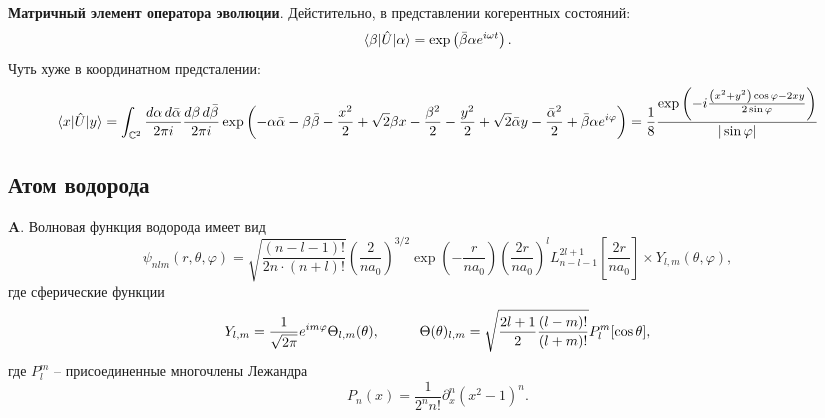 \textbf{Матричный элемент оператора эволюции}. Дейстительно, в представлении когерентных состояний:
\begin{equation*}
    \bk{\beta}[\hat{U}]{\alpha} = \exp\left(\bar{\beta} \alpha e^{i \omega t}\right).
\end{equation*}
Чуть хуже в координатном предсталении:
\begin{equation*}
\langle x | \hat{U}| y\rangle = 
    \int_{\mathbb{C}^2} \frac{ d\alpha \, d \bar{\alpha}}{2 \pi i} \frac{ d\beta \, d \bar{\beta}}{2 \pi i}  \exp\left(
        - \alpha \bar{\alpha} - \beta \bar{\beta} - \frac{x^2}{2} + \sqrt{2} \beta x - \frac{\beta^2}{2} - \frac{y^2}{2} + \sqrt{2} \bar{\alpha} y - \frac{\bar{\alpha}^2}{2} + \bar{\beta} \alpha e^{i \varphi}
    \right)
    = \frac{1}{8}
    \frac{\exp \left(- i\frac{  \left(x^2+y^2\right)\cos \varphi -2 x y}{2 \sin \varphi }\right)}{| \sin \varphi | }
\end{equation*}


\newpage

\subsection*{Атом водорода}

\textbf{A}.
Волновая функция водорода имеет вид
\begin{equation*}
    \psi_{nlm} (r, \theta, \varphi) = 
    \sqrt{\frac{(n-l-1)!}{2n \cdot (n+l)!}} \left(
        \frac{2}{n a_0}
    \right)^{3/2}
    \exp\left(
        - \frac{r}{n a_0}
    \right) \left(
        \frac{2r}{n a_0}
    \right)^l
    L_{n-l-1}^{2l+1}\left[\frac{2r}{n a_0}\right] \times Y_{l,m} (\theta, \varphi),
\end{equation*}
где сферические функции
\begin{equation*}
    Y_{l,m} = \frac{1}{\sqrt{2\pi}} e^{i m \varphi} \Theta_{l,m} (\theta),
    \hspace{10 mm} 
    \Theta(\theta)_{l, m} = \sqrt{\frac{2l+1}{2} \frac{(l-m)!}{(l+m)!}} P_l^m[\cos \theta],
\end{equation*}
где $P_{l}^m$ -- присоединенные многочлены Лежандра
\begin{equation*}
    P_n (x) = \frac{1}{2^n n!} \partial_x^n (x^2-1)^n.
\end{equation*}



